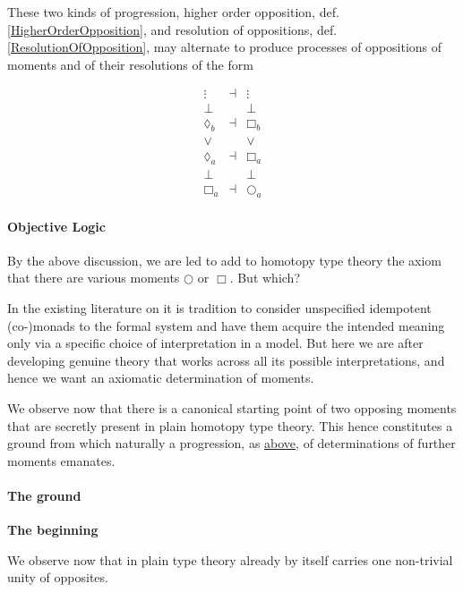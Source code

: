 \documentclass[12pt,titlepage]{article}
\newcommand{\itexarray}[1]{\begin{matrix}#1\end{matrix}}
\theoremstyle{plain}
\theoremstyle{definition}
\theoremstyle{remark}
\begin{document}
These two kinds of progression, higher order opposition, def. \ref{HigherOrderOpposition}, and resolution of oppositions, def. \ref{ResolutionOfOpposition}, may alternate to produce processes of oppositions of moments and of their resolutions of the form

\begin{displaymath}
\itexarray{
     \vdots  &\dashv& \vdots
     \\
     \bot && \bot
     \\
     \lozenge_b &\dashv& \Box_b
     \\
     \vee && \vee
     \\
     \lozenge_a &\dashv& \Box_a
     \\
     \bot && \bot
     \\
     \Box_a &\dashv& \bigcirc_a
  }
\end{displaymath}
\hypertarget{ObjectiveLogic}{}\paragraph*{{Objective Logic}}\label{ObjectiveLogic}

By the above discussion, we are led to add to homotopy type theory the axiom that there are various moments $\bigcirc$ or $\Box$. But which?

In the existing literature on  it is tradition to consider unspecified idempotent (co-)monads to the formal system and have them acquire the intended meaning only via a specific choice of interpretation in a model. But here we are after developing genuine theory that works across all its possible interpretations, and hence we want an axiomatic determination of moments.

We observe now that there is a canonical starting point of two opposing moments that are secretly present in plain homotopy type theory. This hence constitutes a ground from which naturally a progression, as \hyperlink{Progression}{above}, of determinations of further moments emanates.

\hypertarget{TheGround}{}\paragraph*{{The ground}}\label{TheGround}

\textbf{The beginning}

We observe now that in plain type theory already by itself carries one non-trivial unity of opposites.
\end{document}
